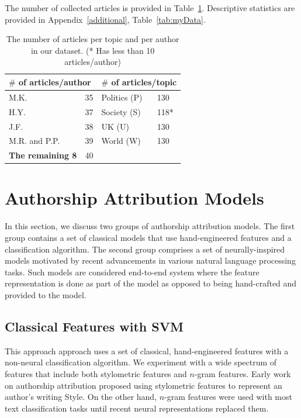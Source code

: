 \documentclass[11pt]{article}
\begin{document}
The number of collected articles is provided in Table~\ref{tab:myData_short}. Descriptive statistics are provided in Appendix~\ref{additional}, Table~\ref{tab:myData}.
\begin{table}[ht]
\caption{The number of articles per topic and per author in our dataset. (* Has less than 10 articles/author)}
    \label{tab:myData_short}
    \centering
    \begin{tabular}{ll |ll }
    \hline 
    \multicolumn{2}{l}{\textbf{$\#$ of articles/author}}   & \multicolumn{2}{|l}{\textbf{$\#$ of articles/topic}}  \\
    \hline
     M.K.                & 35   &  Politics (P) & 130 \\ 
     H.Y.                & 37   &  Society (S)  & 118*  \\
     J.F.                & 38   &  UK (U)       & 130    \\
     M.R. and P.P.       & 39   &  World (W)    & 130    \\
     \textbf{The remaining 8}   & 40 & & \\
     \hline
     \end{tabular}
\end{table}

\section{Authorship Attribution Models\label{subsec:QWS}}
In this section, we discuss two groups of authorship attribution models. The first group contains a set of classical models that use hand-engineered features and a classification algorithm. The second group comprises a set of neurally-inspired models motivated by recent advancements in various natural language processing tasks. Such models are considered end-to-end system where the feature representation is done as part of the model as opposed to being hand-crafted and provided to the model. 


\subsection{Classical Features with SVM} 
This approach approach uses a set of classical, hand-engineered features with a non-neural classification algorithm. We experiment with a wide spectrum of features that include both stylometric features and $n$-gram features. Early work on authorship attribution proposed using stylometric features to represent an author's writing Style. On the other hand, $n$-gram features were used with most text classification tasks until recent neural representations replaced them.
\end{document}
